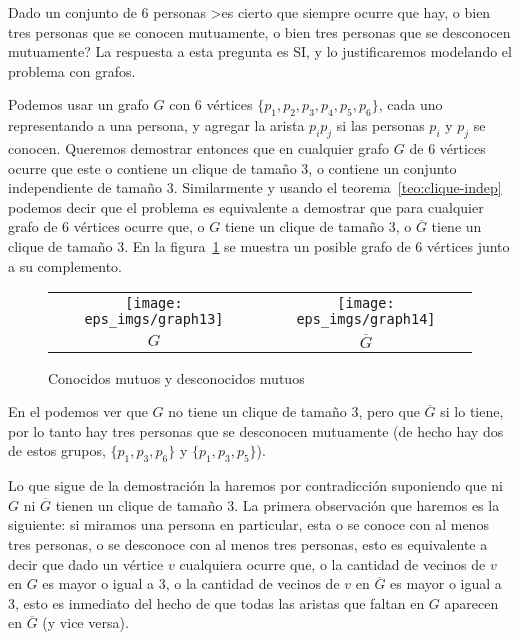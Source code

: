 \begin{ejemplo}
Dado un conjunto de 6 personas >es cierto que siempre ocurre que hay, o bien tres personas que se conocen mutuamente, o bien tres personas que se desconocen mutuamente?
La respuesta a esta pregunta es SI, y lo justificaremos  modelando el problema con grafos.

Podemos usar un grafo $G$ con 6 vértices $\{p_1,p_2,p_3,p_4,p_5,p_6\}$, cada uno representando a una persona, y agregar la arista $p_ip_j$ si las personas $p_i$ y $p_j$ se conocen.
Queremos demostrar entonces que en cualquier grafo $G$ de 6 vértices ocurre que este o contiene un clique de tamaño 3, o contiene un conjunto independiente de tamaño 3.
Similarmente y usando el teorema~\ref{teo:clique-indep} podemos decir que el problema es equivalente a demostrar que para cualquier grafo de 6 vértices ocurre que, o $G$ tiene un clique de tamaño 3, o $\overline G$ tiene un clique de tamaño 3.
En la figura~\ref{fig:clique-indep} se muestra un posible grafo de $6$ vértices junto a su complemento.
\begin{figure}[h!]
\centering
\begin{tabular}{cc}
\texttt{[image: eps\_imgs/graph13]}\hspace*{3em} &  \texttt{[image: eps\_imgs/graph14]} \\
$G$\hspace*{3em} & $\overline G$
\end{tabular}
\caption{Conocidos mutuos y desconocidos mutuos}
\label{fig:clique-indep}
\end{figure}
En el podemos ver que $G$ no tiene un clique de tamaño 3, pero que $\overline G$ si lo tiene, por lo tanto hay tres personas que se desconocen mutuamente (de hecho hay dos de estos grupos, $\{p_1,p_3,p_6\}$ y $\{p_1,p_3,p_5\}$).

Lo que sigue de la demostración la haremos por contradicción suponiendo que ni $G$ ni $\overline G$ tienen un clique de tamaño 3.
La primera observación que haremos es la siguiente:
si miramos una persona en particular, esta o se conoce con al menos tres personas, o se desconoce con al menos tres personas, esto es equivalente a decir que dado un vértice $v$ cualquiera ocurre que, o la cantidad de vecinos de $v$ en $G$ es mayor o igual a 3, o la cantidad de vecinos de $v$ en $\overline G$ es mayor o igual a 3, esto es inmediato del hecho de que todas las aristas que faltan en $G$ aparecen en $\overline G$ (y vice versa).


\end{ejemplo}
